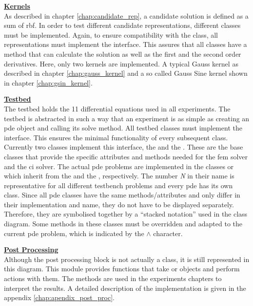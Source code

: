 \documentclass[./\jobname.tex]{subfiles}
\begin{document}
\large \underline{\textbf{Kernels}} \\
As described in chapter \ref{chap:candidate_rep}, a candidate solution is defined as a sum of \gls{rbf}. In order to test different candidate representations, different classes must be implemented. Again, to ensure compatibility with the  class, all representations must implement the  interface. This assures that all classes have a method that can calculate the solution as well as the first and the second order derivatives. Here, only two kernels are implemented. A typical Gauss kernel as described in chapter \ref{chap:gauss_kernel} and a so called Gauss Sine kernel shown in chapter \ref{chap:gsin_kernel}. 

\large \underline{\textbf{Testbed}} \\
The testbed holds the 11 differential equations used in all experiments. The testbed is abstracted in such a way that an experiment is as simple as creating an \gls{pde} object and calling its solve method. All testbed classes must implement the  interface. This ensures the minimal functionality of every subsequent class. Currently two classes implement this interface, the  and the . These are the base classes that provide the specific attributes and methods needed for the \gls{fem} solver and the \gls{ci} solver. The actual \gls{pde} problems are implemented in the classes  or  which inherit from the  and the , respectively. The number \textit{N} in their name is representative for all different testbench problems and every \gls{pde} has its own class. Since all \gls{pde} classes have the same methods/attributes and only differ in their implementation and name, they do not have to be displayed separately. Therefore, they are symbolised together by a ``stacked notation'' used in the class diagram. Some methods in these classes must be overridden and adapted to the current \gls{pde} problem, which is indicated by the $\land$ character.

\large \underline{\textbf{Post Processing}} \\
Although the post processing block is not actually a class, it is still represented in this diagram. This module provides functions that take  or  objects and perform actions with them. The methods are used in the experiments chapters to interpret the results. A detailed description of the implementation is given in the appendix \ref{chap:apendix_post_proc}.
\end{document}
